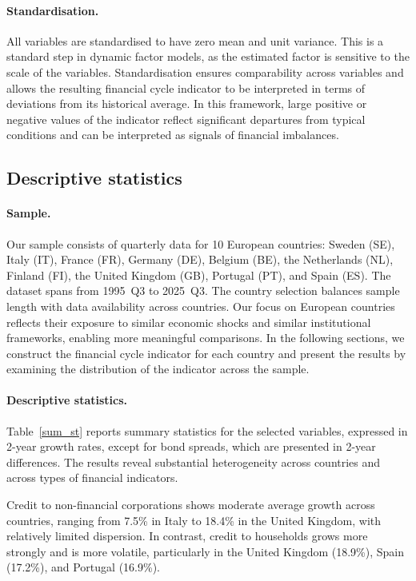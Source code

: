 \paragraph{Standardisation.}
All variables are standardised to have zero mean and unit variance. This is a standard step in dynamic factor models, as the estimated factor is sensitive to the scale of the variables. Standardisation ensures comparability across variables and allows the resulting financial cycle indicator to be interpreted in terms of deviations from its historical average. In this framework, large positive or negative values of the indicator reflect significant departures from typical conditions and can be interpreted as signals of financial imbalances.

\subsection{Descriptive statistics}

\paragraph{Sample.}
Our sample consists of quarterly data for 10 European countries: Sweden (SE), Italy (IT), France (FR), Germany (DE), Belgium (BE), the Netherlands (NL), Finland (FI), the United Kingdom (GB), Portugal (PT), and Spain (ES). The dataset spans from 1995~Q3 to 2025~Q3. The country selection balances sample length with data availability across countries. Our focus on European countries reflects their exposure to similar economic shocks and similar institutional frameworks, enabling more meaningful comparisons. In the following sections, we construct the financial cycle indicator for each country and present the results by examining the distribution of the indicator across the sample.

\paragraph{Descriptive statistics.}
Table~\ref{sum_st} reports summary statistics for the selected variables, expressed in 2-year growth rates, except for bond spreads, which are presented in 2-year differences. The results reveal substantial heterogeneity across countries and across types of financial indicators.

Credit to non-financial corporations shows moderate average growth across countries, ranging from 7.5\% in Italy to 18.4\% in the United Kingdom, with relatively limited dispersion. In contrast, credit to households grows more strongly and is more volatile, particularly in the United Kingdom (18.9\%), Spain (17.2\%), and Portugal (16.9\%).

